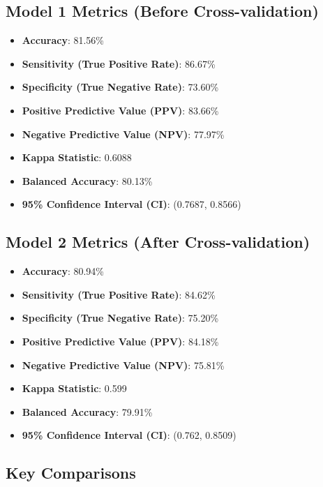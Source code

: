 \documentclass[
]{article}
\providecommand{\tightlist}{%
  \setlength{\itemsep}{0pt}\setlength{\parskip}{0pt}}
\begin{document}
\hypertarget{model-1-metrics-before-cross-validation}{%
\subsection{Model 1 Metrics (Before
Cross-validation)}\label{model-1-metrics-before-cross-validation}}

\begin{itemize}
\tightlist
\item
  \textbf{Accuracy}: 81.56\%
\item
  \textbf{Sensitivity (True Positive Rate)}: 86.67\%
\item
  \textbf{Specificity (True Negative Rate)}: 73.60\%
\item
  \textbf{Positive Predictive Value (PPV)}: 83.66\%
\item
  \textbf{Negative Predictive Value (NPV)}: 77.97\%
\item
  \textbf{Kappa Statistic}: 0.6088
\item
  \textbf{Balanced Accuracy}: 80.13\%
\item
  \textbf{95\% Confidence Interval (CI)}: (0.7687, 0.8566)
\end{itemize}

\hypertarget{model-2-metrics-after-cross-validation}{%
\subsection{Model 2 Metrics (After
Cross-validation)}\label{model-2-metrics-after-cross-validation}}

\begin{itemize}
\tightlist
\item
  \textbf{Accuracy}: 80.94\%
\item
  \textbf{Sensitivity (True Positive Rate)}: 84.62\%
\item
  \textbf{Specificity (True Negative Rate)}: 75.20\%
\item
  \textbf{Positive Predictive Value (PPV)}: 84.18\%
\item
  \textbf{Negative Predictive Value (NPV)}: 75.81\%
\item
  \textbf{Kappa Statistic}: 0.599
\item
  \textbf{Balanced Accuracy}: 79.91\%
\item
  \textbf{95\% Confidence Interval (CI)}: (0.762, 0.8509)
\end{itemize}

\hypertarget{key-comparisons}{%
\subsection{Key Comparisons}\label{key-comparisons}}
\end{document}
